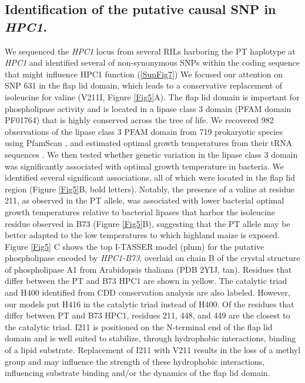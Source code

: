 \documentclass[9pt,twocolumn,twoside,lineno]{biorxiv}
\begin{document}
\subsection{Identification of the putative causal SNP in \textit{HPC1}.} 
We sequenced the \textit{HPC1} locus from several RILs harboring the PT haplotype at \textit{HPC1} and identified several of non-synonymous SNPs within the coding sequence that might influence HPC1 function (\ref{SupFig7})
We focused our attention on SNP 631 in the flap lid domain, which leads to a conservative replacement of isoleucine for valine (V211I, Figure \ref{Fig5}A).  
The flap lid domain is important for phospholipase activity and is located in a lipase class 3 domain (PFAM domain PF01764) that is highly conserved across the tree of life. 
We recovered 982 observations of the lipase class 3 PFAM domain from 719 prokaryotic species using PfamScan \cite{Potter2018-tk, El-Gebali2019-pw}, and estimated optimal growth temperatures from their tRNA sequences \cite{Cimen2020-dm}.
We then tested whether genetic variation in the lipase class 3 domain was significantly associated with optimal growth temperature in bacteria. 
We identified several significant associations, all of which were located in the flap lid region (Figure \ref{Fig5}B, bold letters).  
Notably, the presence of a valine at residue 211, as observed in the PT allele, was associated with lower bacterial optimal growth temperatures relative to bacterial lipases that harbor the isoleucine residue observed in B73 (Figure \ref{Fig5}B), suggesting that the PT allele may be better adapted to the low temperatures to which highland maize is exposed.
Figure \ref{Fig5} C shows the top I-TASSER model (plum) for the putative phospholipase encoded by \textit{HPC1-B73}, overlaid on chain B of the crystal structure of phospholipase A1 from Arabidopsis thaliana (PDB 2YIJ, tan). 
Residues that differ between the PT and B73 HPC1 are shown in yellow. 
The catalytic triad and H400 identified from CDD conservation analysis are also labeled.
However, our models put H416 in the catalytic triad instead of H400. 
Of the residues that differ between PT and B73 HPC1, residues 211, 448, and 449 are the closest to the catalytic triad. 
I211 is positioned on the N-terminal end of the flap lid domain and is well suited to stabilize, through hydrophobic interactions, binding of a lipid substrate.
Replacement of I211 with V211 results in the loss of a methyl group and may influence the strength of these hydrophobic interactions, influencing substrate binding and/or the dynamics of the flap lid domain.
\end{document}
